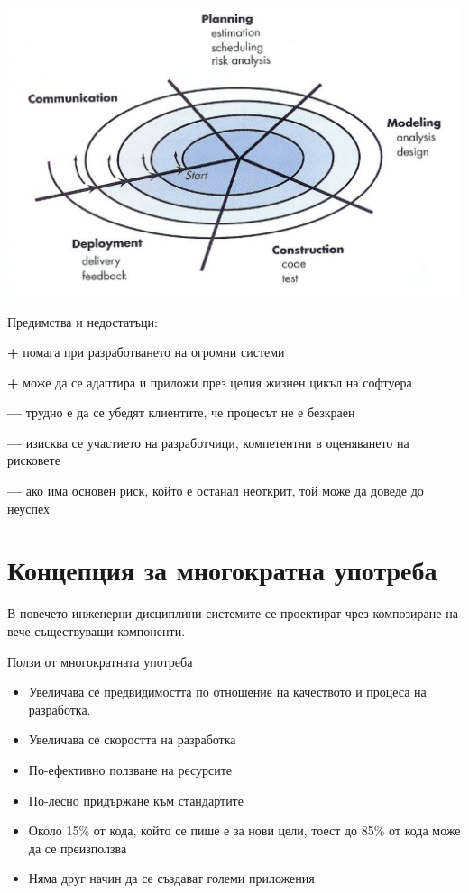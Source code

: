 \documentclass[fleqn,12pt]{article}
\begin{document}
\leavevmode \newline
\includegraphics[width=\textwidth]{spiral}
\leavevmode \newline

Предимства и недостатъци:
\begin{description}
	\item \textbf{+} помага при разработването на огромни системи
	\item \textbf{+} може да се адаптира и приложи през целия жизнен цикъл на софтуера
	\item \textbf{---} трудно е да се убедят клиентите, че процесът не е безкраен
	\item \textbf{---} изисква се участието на разработчици, компетентни в оценяването на рисковете
	\item \textbf{---} ако има основен риск, който е останал неоткрит, той може да доведе до неуспех
\end{description}

\section{Концепция за многократна употреба}
В повечето инженерни дисциплини системите се проектират чрез композиране на вече съществуващи компоненти.

Ползи от многократната употреба
\begin{itemize}
	\item Увеличава се предвидимостта по отношение на качеството и процеса на разработка.
	\item Увеличава се скоростта на разработка
	\item По-ефективно ползване на ресурсите
	\item По-лесно придържане към стандартите
	\item Около 15\% от кода, който се пише е за нови цели, тоест до 85\% от кода може да се преизползва
	\item Няма друг начин да се създават големи приложения
\end{itemize}
\end{document}
